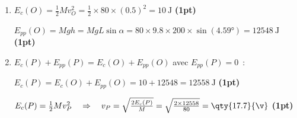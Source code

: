 \begin{enumerate}
    \item $E_c(O)=\frac12 Mv_O^2=\frac12\times80\times(0.5)^2=\qty{10}{\J}$
          \hfill\textbf{(1pt)}

          $E_{pp}(O)=Mgh=MgL\sin\alpha=
          80\times9.8\times200\times\sin(\ang{4.59})=\qty{12548}{\J}$
          \hfill\textbf{(1pt)}

    \item $E_c(P)+E_{pp}(P)=E_c(O)+E_{pp}(O)$ avec $E_{pp}(P)=0$~:

          $E_c(P)=E_c(O)+E_{pp}(O)=10+12548=\qty{12558}{\J}$
          \hfill\textbf{(1pt)}

          $E_c(P)=\frac12 Mv_P^2
          \quad\Rightarrow\quad
          v_P=\sqrt{\frac{2E_c(P)}{M}}=
          \sqrt{\frac{2\times12558}{80}}=\qty{17.7}{\v}$
          \hfill\textbf{(1pt)}
\end{enumerate}
